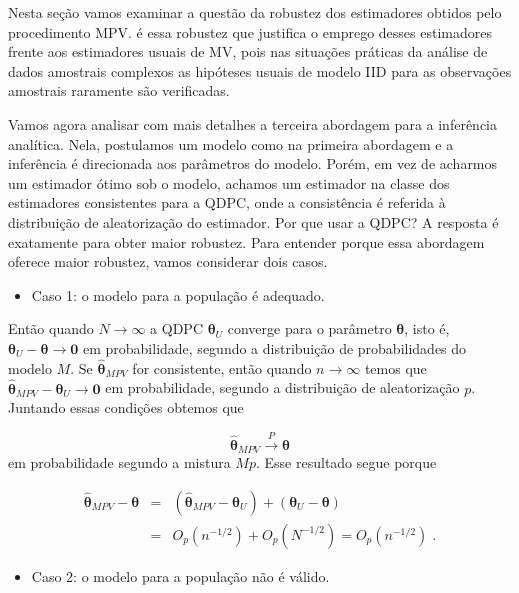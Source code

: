\documentclass[]{book}
\providecommand{\tightlist}{%
  \setlength{\itemsep}{0pt}\setlength{\parskip}{0pt}}
\numberwithin{example}{chapter}
\numberwithin{remark}{chapter}
\numberwithin{definition}{chapter}
\begin{document}
Nesta seção vamos examinar a questão da robustez dos estimadores obtidos
pelo procedimento MPV. é essa robustez que justifica o emprego desses
estimadores frente aos estimadores usuais de MV, pois nas situações
práticas da análise de dados amostrais complexos as hipóteses usuais de
modelo IID para as observações amostrais raramente são verificadas.

Vamos agora analisar com mais detalhes a terceira abordagem para a
inferência analítica. Nela, postulamos um modelo como na primeira
abordagem e a inferência é direcionada aos parâmetros do modelo. Porém,
em vez de acharmos um estimador ótimo sob o modelo, achamos um estimador
na classe dos estimadores consistentes para a QDPC, onde a consistência
é referida à distribuição de aleatorização do estimador. Por que usar a
QDPC? A resposta é exatamente para obter maior robustez. Para entender
porque essa abordagem oferece maior robustez, vamos considerar dois
casos.

\begin{itemize}
\tightlist
\item
  Caso 1: o modelo para a população é adequado.
\end{itemize}

Então quando \(N\rightarrow \infty\) a QDPC \(\mathbf{\theta }_{U}\)
converge para o parâmetro \(\mathbf{\theta }\), isto é,
\(\mathbf{\theta }_{U}-\mathbf{\theta }\rightarrow \mathbf{0}\) em
probabilidade, segundo a distribuição de probabilidades do modelo \(M\).
Se \(\mathbf{\hat{\theta}}_{MPV}\) for consistente, então quando
\(n\rightarrow \infty\) temos que
\(\mathbf{\hat{\theta}}_{MPV}-\mathbf{\theta }_{U}\rightarrow\mathbf{0}\)
em probabilidade, segundo a distribuição de aleatorização \(p\).
Juntando essas condições obtemos que

\[
\mathbf{\hat{\theta}}_{MPV}\stackrel{P}{\rightarrow }\mathbf{\theta } 
\] em probabilidade segundo a mistura \(Mp\). Esse resultado segue
porque

\begin{eqnarray*}
\mathbf{\hat{\theta}}_{MPV}-\mathbf{\theta } &=&(\mathbf{\hat{\theta}}_{MPV}-
\mathbf{\theta }_{U})+\left( \mathbf{\theta }_{U}-\mathbf{\theta }\right) \\
&=&O_{p}(n^{-1/2})+O_{p}(N^{-1/2})=O_{p}(n^{-1/2})\;.
\end{eqnarray*}

\begin{itemize}
\tightlist
\item
  Caso 2: o modelo para a população não é válido.
\end{itemize}
\end{document}
